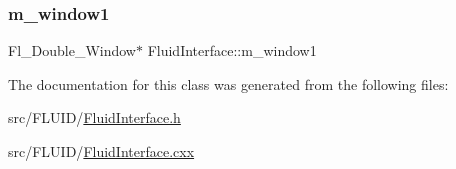 \subsubsection{\texorpdfstring{m\+\_\+window1}{m\_window1}}
{\footnotesize\ttfamily Fl\+\_\+\+Double\+\_\+\+Window$\ast$ Fluid\+Interface\+::m\+\_\+window1}



The documentation for this class was generated from the following files\+:\begin{DoxyCompactItemize}
\item 
src/\+F\+L\+U\+I\+D/\hyperlink{_fluid_interface_8h}{Fluid\+Interface.\+h}\item 
src/\+F\+L\+U\+I\+D/\hyperlink{_fluid_interface_8cxx}{Fluid\+Interface.\+cxx}\end{DoxyCompactItemize}
